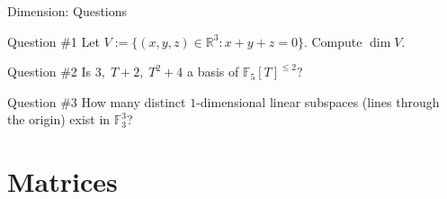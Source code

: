 \documentclass{zkdl-presentation-template}
\begin{document}
    \begin{frame}{Dimension: Questions}
        \begin{questionblock}{Question \#1}
            Let $V := \{(x,y,z) \in \mathbb{R}^3: x+y+z=0\}$. Compute $\dim V$.
        \end{questionblock}
        \pause

        \begin{questionblock}{Question \#2}
            Is $3,\; T+2,\; T^2+4$ a basis of $\mathbb{F}_5[T]^{\leq 2}$?
        \end{questionblock}
        \pause

        \begin{questionblock}{Question \#3}
            How many distinct $1$-dimensional linear subspaces (lines through the origin) exist in $\mathbb{F}_3^3$?
        \end{questionblock}
    \end{frame}

    \section{Matrices}
\end{document}
